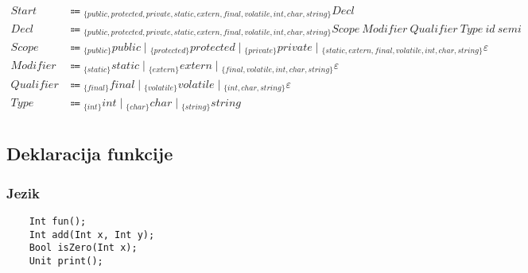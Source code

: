 \documentclass{report}
\newcommand{\Null}{\varepsilon}
\newcommand{\Spc}{\ }
\newcommand{\Union}{\mathrel{|}}
\newcommand{\Arrow}{\Coloneq}
\newcommand{\NT}[1]{{#1}}
\newcommand{\T}[1]{{#1}}
\newcommand{\Lookahead}[1]{{}_{\{{#1}\}}}
\begin{document}
    \begin{equation*}
      \begin{aligned}
        \NT{Start} &\Arrow \Lookahead{\T{public}, \T{protected}, \T{private}, \T{static}, \T{extern}, \T{final}, \T{volatile}, \T{int}, \T{char}, \T{string}} \NT{Decl}\\
        \NT{Decl} &\Arrow \Lookahead{\T{public}, \T{protected}, \T{private}, \T{static}, \T{extern}, \T{final}, \T{volatile}, \T{int}, \T{char}, \T{string}} \NT{Scope} \Spc \NT{Modifier} \Spc \NT{Qualifier} \Spc \NT{Type} \Spc \T{id} \Spc \T{semi}\\
        \NT{Scope} &\Arrow \Lookahead{\T{public}} \T{public} \Union \Lookahead{\T{protected}} \T{protected} \Union \Lookahead{\T{private}} \T{private} \Union \Lookahead{\T{static}, \T{extern}, \T{final}, \T{volatile}, \T{int}, \T{char}, \T{string}} \Null\\
        \NT{Modifier} &\Arrow \Lookahead{\T{static}} \T{static} \Union \Lookahead{\T{extern}} \T{extern} \Union \Lookahead{\T{final}, \T{volatile}, \T{int}, \T{char}, \T{string}} \Null\\
        \NT{Qualifier} &\Arrow \Lookahead{\T{final}} \T{final} \Union \Lookahead{\T{volatile}} \T{volatile} \Union \Lookahead{\T{int}, \T{char}, \T{string}} \Null\\
        \NT{Type} &\Arrow \Lookahead{\T{int}}  \T{int} \Union \Lookahead{\T{char}} \T{char} \Union \Lookahead{\T{string}} \T{string}\\
      \end{aligned}
    \end{equation*}

    \subsection{Deklaracija funkcije}

    \subsubsection*{Jezik}
    \begin{verbatim}
    Int fun();
    Int add(Int x, Int y);
    Bool isZero(Int x);
    Unit print();
    \end{verbatim}
\end{document}
